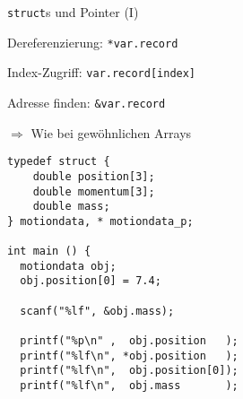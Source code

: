 
\begin{frame}[fragile]{\texttt{struct}s und Pointer (I)}
%
%
\begin{itembox}[Arrays als records, equal height group=GStrPtrI]
\item Dereferenzierung: \newline
	\texttt{*var.record}
\item Index-Zugriff: \newline
	\texttt{var.record[index]}
\item Adresse finden: \newline
	\texttt{\&var.record}
\item[$\Rightarrow$] Wie bei gewöhnlichen Arrays
\end{itembox}
%
\begin{codebox}[Code, equal height group=GStrPtrI]
\begin{verbatim}
typedef struct {
    double position[3];
    double momentum[3];
    double mass;
} motiondata, * motiondata_p;

int main () {
  motiondata obj;
  obj.position[0] = 7.4;

  scanf("%lf", &obj.mass);

  printf("%p\n" ,  obj.position   );
  printf("%lf\n", *obj.position   );
  printf("%lf\n",  obj.position[0]);
  printf("%lf\n",  obj.mass       );
\end{verbatim}
\end{codebox}
%
\end{frame}


